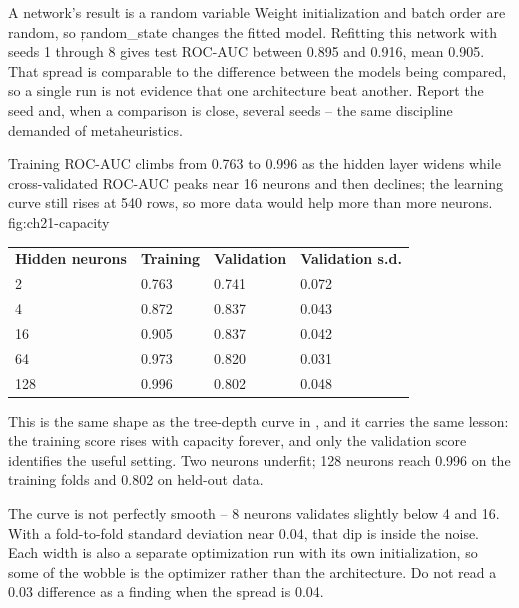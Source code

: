 \begin{ExplainBox}{A network's result is a random variable}
Weight initialization and batch order are random, so \c{random_state} changes the
fitted model. Refitting this network with seeds 1 through 8 gives test ROC-AUC
between 0.895 and 0.916, mean 0.905. That spread is comparable to the difference
between the models being compared, so a single run is not evidence that one
architecture beat another. Report the seed and, when a comparison is close,
several seeds -- the same discipline  demanded of
metaheuristics.
\end{ExplainBox}


{Training ROC-AUC climbs from 0.763 to 0.996 as the hidden layer widens while cross-validated ROC-AUC peaks near 16 neurons and then declines; the learning curve still rises at 540 rows, so more data would help more than more neurons.}
{fig:ch21-capacity}

\begin{center}
\begin{tabular}{llll}
\textbf{Hidden neurons} & \textbf{Training} & \textbf{Validation} & \textbf{Validation s.d.} \\
2 & 0.763 & 0.741 & 0.072 \\
4 & 0.872 & 0.837 & 0.043 \\
16 & 0.905 & 0.837 & 0.042 \\
64 & 0.973 & 0.820 & 0.031 \\
128 & 0.996 & 0.802 & 0.048 \\
\end{tabular}
\end{center}

This is the same shape as the tree-depth curve in
, and it carries the same lesson: the training score
rises with capacity forever, and only the validation score identifies the useful
setting. Two neurons underfit; 128 neurons reach 0.996 on the training folds and
0.802 on held-out data.

The curve is not perfectly smooth -- 8 neurons validates slightly below 4 and 16.
With a fold-to-fold standard deviation near 0.04, that dip is inside the noise.
Each width is also a separate optimization run with its own initialization, so
some of the wobble is the optimizer rather than the architecture. Do not read a
0.03 difference as a finding when the spread is 0.04.


